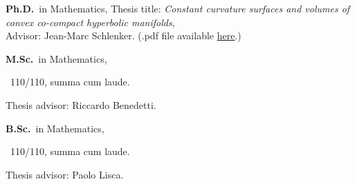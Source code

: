 
	{%
		\textbf{Ph.D.}~in Mathematics,}
	{%
	Thesis title: \emph{Constant curvature surfaces and volumes of convex co-compact hyperbolic manifolds}, \\
	Advisor: Jean-Marc Schlenker. (.pdf file available \href{https://orbilu.uni.lu/handle/10993/43901}{here}.)}

		{%
			\textbf{M.Sc.}~in Mathematics, \begin{footnotesize}
			~110/110, summa cum laude.
		\end{footnotesize}}
		{Thesis advisor: Riccardo Benedetti.}

{%
	\textbf{B.Sc.}~in Mathematics, \begin{footnotesize}
	~110/110, summa cum laude.
\end{footnotesize}}{Thesis advisor: Paolo Lisca.}
